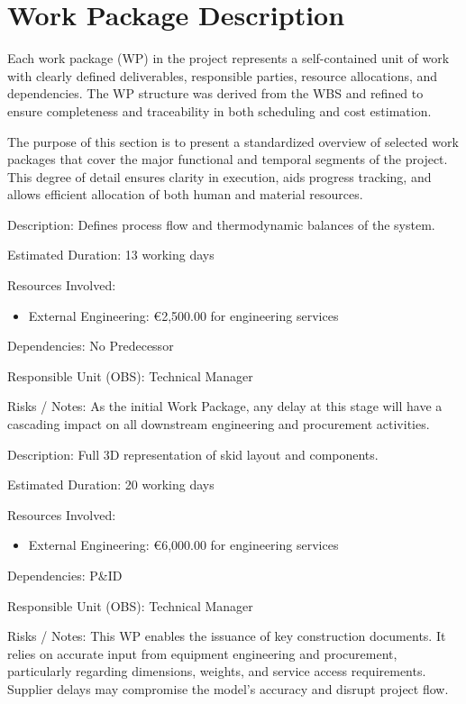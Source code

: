 \section{Work Package Description}

Each work package (WP) in the project represents a self-contained unit of work with clearly defined deliverables, responsible parties, resource allocations, and dependencies. The WP structure was derived from the WBS and refined to ensure completeness and traceability in both scheduling and cost estimation.

The purpose of this section is to present a standardized overview of selected work packages that cover the major functional and temporal segments of the project. This degree of detail ensures clarity in execution, aids progress tracking, and allows efficient allocation of both human and material resources.

\begin{tcolorbox}[boxstyle2, title=PFD - Heat and Mass Balance]
Description:
Defines process flow and thermodynamic balances of the system.

Estimated Duration: 13 working days

Resources Involved:
\begin{itemize}
    \item External Engineering: €2,500.00 for engineering services
\end{itemize}

Dependencies:
No Predecessor

Responsible Unit (OBS): Technical Manager

Risks / Notes:
As the initial Work Package, any delay at this stage will have a cascading impact on all downstream engineering and procurement activities.
\end{tcolorbox}

\begin{tcolorbox}[boxstyle2, title=3D Model]
Description:
Full 3D representation of skid layout and components.

Estimated Duration: 20 working days

Resources Involved:
\begin{itemize}
    \item External Engineering: €6,000.00 for engineering services
\end{itemize}

Dependencies:
P\&ID

Responsible Unit (OBS): Technical Manager

Risks / Notes:
This WP enables the issuance of key construction documents. It relies on accurate input from equipment engineering and procurement, particularly regarding dimensions, weights, and service access requirements. Supplier delays may compromise the model’s accuracy and disrupt project flow.
\end{tcolorbox}

